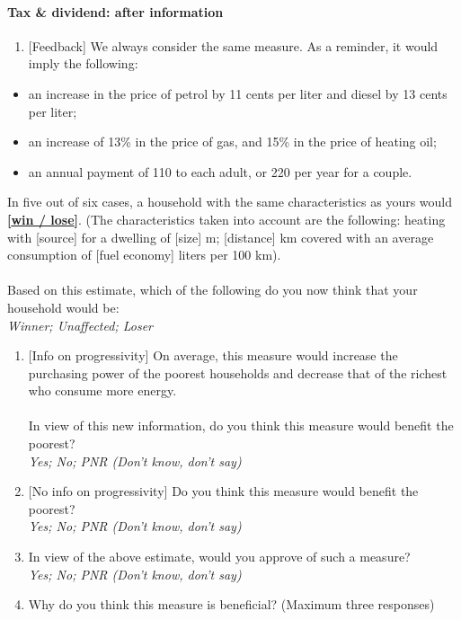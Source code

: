 \documentclass[12pt]{article} %
\begin{document}
\begin{appendices}
\paragraph{Tax \& dividend: after information}
\begin{enumerate}[resume,leftmargin=*]
\item {[}Feedback{]} We always consider the same measure. As a reminder,
it would imply the following: 
\end{enumerate}
\begin{itemize}
\item an increase in the price of petrol by 11 cents per liter and diesel
by 13 cents per liter; 
\item an increase of 13\% in the price of gas, and 15\% in the price of
heating oil; 
\item an annual payment of 110\euros{} to each adult, or 220\euros{} per year for a couple. 
\end{itemize}
In five out of six cases, a household with the same characteristics
as yours would \textbf{\underline{{[}win / lose{]}}}. (The characteristics
taken into account are the following: heating with {[}source{]} for a dwelling of
{[}size{]} m\texttwosuperior ; {[}distance{]} km covered with an average
consumption of {[}fuel economy{]} liters per 100 km). \\
\\
Based on this estimate, which of the following do you now think that your household would
be: \emph{}\\
\emph{Winner; Unaffected; Loser} 
\begin{enumerate}[resume,leftmargin=*]
\item {[}Info on progressivity{]} On average, this measure would increase
the purchasing power of the poorest households and decrease that of the
richest who consume more energy. \\
\\
In view of this new information, do you think this measure would benefit
the poorest? \emph{}\\
\emph{Yes; No; PNR (Don't know, don't say)}
\item {[}No info on progressivity{]} Do you think this measure would benefit
the poorest?\\
\emph{Yes; No; PNR (Don't know, don't say)}
\item In view of the above estimate, would you approve of such a measure?
\emph{}\\
\emph{Yes; No; PNR (Don't know, don't say)} 
\item Why do you think this measure is beneficial? (Maximum three responses)

\end{enumerate}
\end{appendices}
\end{document}
